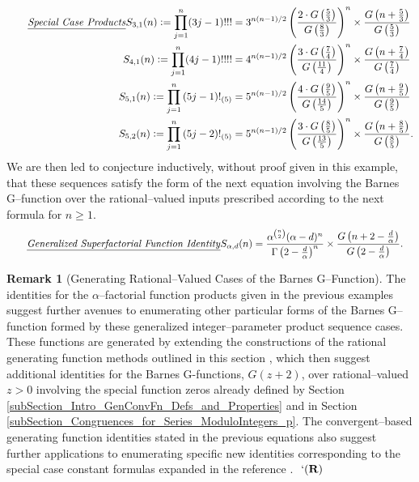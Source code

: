 \documentclass[12pt,reqno]{article}
\numberwithin{sfootnote}{section}
\numberwithin{equation}{section}
\newcommand{\tagtext}[1]{\tag*{\underline{\textit{#1}}}}
\theoremstyle{DefaultTheoremStyle}
\theoremstyle{definition}
\newtheorem{remark}[theorem]{Remark}
\newcommand{\eolqedsymbol}[1]{{\hrulefill\ensuremath{\ #1}}}
\renewcommand{\eolqedsymbol}[1]{{\mboxfill{ }\ensuremath{\ #1}}}
\newcommand{\RemarkQEDSymbol}{`(\text{\rm{\bf R}})}
\newcommand{\RemarkQED}{\eolqedsymbol{\RemarkQEDSymbol}}
\newcommand{\defequals}{\ensuremath{\vcentcolon=}}
\newcommand{\AlphaFactorial}[2]{\ensuremath{\left(#1\right)!_{\left(#2\right)}}}
\begin{document}
\begin{align*} 
\tagtext{Special Case Products} 
S_{3,1}(n) \defequals 
     \prod_{j=1}^{n} (3j-1)!!! & = 
     3^{n(n-1)/2} \left( \frac{2 \cdot G\left(\frac{5}{3}\right)}{ 
     G\left(\frac{8}{3}\right)}\right)^{n} 
     \times \frac{G\left(n+\frac{5}{3}\right)}{G\left(\frac{5}{3}\right)} \\ 
S_{4,1}(n) \defequals  
\prod_{j=1}^{n} (4j-1)!!!! & = 
     4^{n(n-1)/2} \left( \frac{3 \cdot G\left(\frac{7}{4}\right)}{ 
     G\left(\frac{11}{4}\right)}\right)^{n} 
     \times \frac{G\left(n+\frac{7}{4}\right)}{G\left(\frac{7}{4}\right)} \\ 
S_{5,1}(n) \defequals 
\prod_{j=1}^{n} \AlphaFactorial{5j-1}{5} & = 
     5^{n(n-1)/2} \left( \frac{4 \cdot G\left(\frac{9}{5}\right)}{ 
     G\left(\frac{14}{5}\right)}\right)^{n} 
     \times \frac{G\left(n+\frac{9}{5}\right)}{G\left(\frac{9}{5}\right)} \\ 
S_{5,2}(n) \defequals 
\prod_{j=1}^{n} \AlphaFactorial{5j-2}{5} & = 
     5^{n(n-1)/2} \left( \frac{3 \cdot G\left(\frac{8}{5}\right)}{ 
     G\left(\frac{13}{5}\right)}\right)^{n} 
     \times \frac{G\left(n+\frac{8}{5}\right)}{G\left(\frac{8}{5}\right)}. 
\end{align*} 
We are then led to conjecture inductively, without proof 
given in this example, that these sequences satisfy the form of the 
next equation involving the Barnes G--function over the 
rational--valued inputs prescribed according to the 
next formula for $n \geq 1$. 
\begin{align*} 
\tagtext{Generalized Superfactorial Function Identity} 
S_{\alpha,d}(n) 
     & = 
     \frac{\alpha^{\binom{n}{2}} (\alpha - d)^{n}}{ 
     \Gamma\left(2 - \frac{d}{\alpha}\right)^{n}} \times 
     \frac{G\left(n + 2 - \frac{d}{\alpha}\right)}{ 
     G\left(2 - \frac{d}{\alpha}\right)}. 
\end{align*} 

\begin{remark}[Generating Rational--Valued Cases of the Barnes G--Function] 
The identities for the $\alpha$--factorial function products given in the 
previous examples suggest further avenues to 
enumerating other particular forms of the Barnes G--function formed by these 
generalized integer--parameter product sequence cases. 
These functions are generated by extending the constructions of the 
rational generating function methods outlined in this section 
\citep{CONTRIB-THEORY-BARNESGFN,ON-HYPGEOMFNS-PHKSYMBOL}, 
which then suggest additional identities for the Barnes G-functions, 
$G(z+2)$, over rational--valued $z > 0$ 
involving the special function zeros already defined by 
Section \ref{subSection_Intro_GenConvFn_Defs_and_Properties} and in 
Section \ref{subSection_Congruences_for_Series_ModuloIntegers_p}. 
The convergent--based generating function identities stated in the 
previous equations also suggest further applications to 
enumerating specific new identities corresponding to the 
special case constant formulas expanded in the reference 
\citep[\S 2]{CONTRIB-THEORY-BARNESGFN}. 
\RemarkQED 
\end{remark} 
\end{document}
